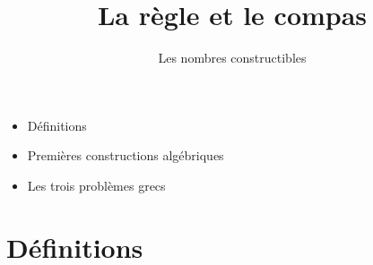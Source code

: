 


\newcommand{\construc}{\mathcal{C}}
\newcommand{\plan}{\mathcal{P}}
\newcommand{\cercle}{\mathcal{C}}







\title{{\bf La règle et le compas}}
\subtitle{Les nombres constructibles}

\begin{frame}
  
  \debutmontitre

  \pause

{\footnotesize
\hfill
{}
\begin{minipage}{0.6\textwidth}
  \begin{itemize}
    \item<3-> Définitions
    \item<4-> Premières constructions algébriques
    \item<5-> Les trois problèmes grecs
  \end{itemize}
\end{minipage}
}

\end{frame}

\setcounter{framenumber}{0}


\section{Définitions}


